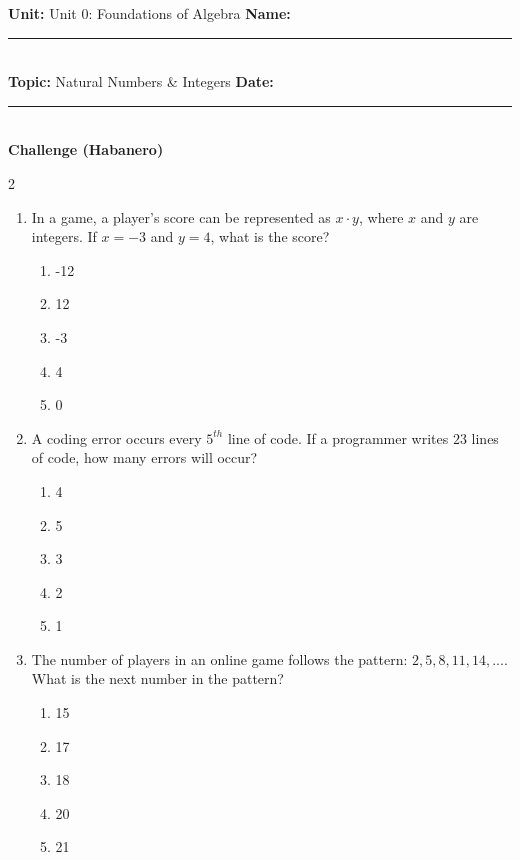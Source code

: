 \documentclass[10pt]{article}
\begin{document}
\enlargethispage{2.5cm}

\begin{tcolorbox}[colback=mainblue!5, colframe=mainblue, sharp corners, boxrule=0.5pt]
    \small \textbf{Unit:} Unit 0: Foundations of Algebra \hfill \textbf{Name:} \rule{3cm}{0.4pt} \\
    \small \textbf{Topic:} Natural Numbers & Integers \hfill \textbf{Date:} \rule{2cm}{0.4pt} \\
    \centering \textbf{\large Challenge (Habanero)}
\end{tcolorbox}

\vspace{0.2cm}

\begin{multicols}{2}
\begin{enumerate}[label=\textbf{Q\arabic*.}, leftmargin=*, itemsep=6pt, parsep=0pt]

  \item \small In a game, a player's score can be represented as $x \cdot y$, where $x$ and $y$ are integers. If $x = -3$ and $y = 4$, what is the score?
  \begin{enumerate}[label=(\Alph*), leftmargin=0.6cm, nosep, itemsep=2pt]
    \item -12
    \item 12
    \item -3
    \item 4
    \item 0
  \end{enumerate}

  \item \small A coding error occurs every $5^{th}$ line of code. If a programmer writes $23$ lines of code, how many errors will occur?
  \begin{enumerate}[label=(\Alph*), leftmargin=0.6cm, nosep, itemsep=2pt]
    \item 4
    \item 5
    \item 3
    \item 2
    \item 1
  \end{enumerate}

  \item \small The number of players in an online game follows the pattern: $2, 5, 8, 11, 14, ...$. What is the next number in the pattern?
  \begin{enumerate}[label=(\Alph*), leftmargin=0.6cm, nosep, itemsep=2pt]
    \item 15
    \item 17
    \item 18
    \item 20
    \item 21
  \end{enumerate}


\end{enumerate}
\end{multicols}
\end{document}

